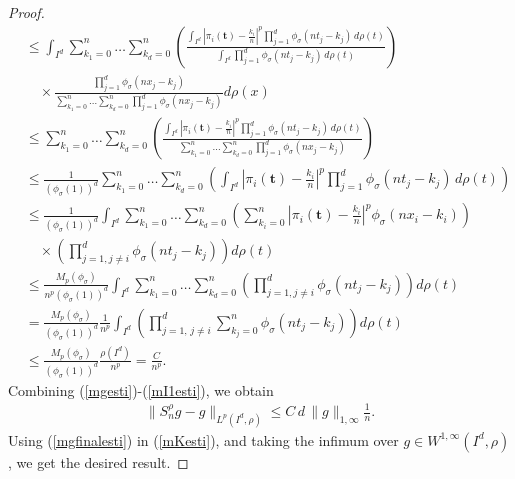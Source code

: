 \documentclass[12pt, reqno]{amsart}
\numberwithin{equation}{section}
\theoremstyle{definition}
\theoremstyle{remark}
\numberwithin{equation}{section}
\newcommand{\LP}{L^p(I^d, \rho)}
\begin{document}
\begin{proof}
\begin{align}
&\leq \int_{I^d}\sum_{k_1=0}^n \ldots \sum_{k_d=0}^n \left( \frac{\int_{I^d} \left|\pi_i(\mathbf{t}) - \frac{k_i}{n}\right|^p \prod_{j=1}^d \phi_\sigma(nt_j - k_j) \, d\rho(t)}{\int_{I^d} \prod_{j=1}^d \phi_\sigma(nt_j - k_j) \, d\rho(t)} \right) \nonumber \\
&\quad \times \frac{\prod_{j=1}^d \phi_\sigma(nx_j - k_j)}{\sum_{k_1=0}^n \ldots \sum_{k_d=0}^n \prod_{j=1}^d \phi_\sigma(nx_j - k_j)}   d\rho(x) \nonumber \\
&\leq \sum_{k_1=0}^n \ldots \sum_{k_d=0}^n  \left( \frac{\int_{I^d} \left|\pi_i(\mathbf{t}) - \frac{k_i}{n}\right|^p \prod_{j=1}^d \phi_\sigma(nt_j - k_j) \, d\rho(t)}{\sum_{k_1=0}^n \ldots \sum_{k_d=0}^n \prod_{j=1}^d \phi_\sigma(nx_j - k_j)} \right) \nonumber\\
&\leq \frac{1}{(\phi_\sigma(1))^d} \sum_{k_1=0}^n \ldots \sum_{k_d=0}^n  \left( \int_{I^d} \left|\pi_i(\mathbf{t}) - \frac{k_i}{n}\right|^p \prod_{j=1}^d \phi_\sigma(nt_j - k_j)\, d\rho(t)\right) \nonumber\\
&\leq \frac{1}{(\phi_\sigma(1))^d} \int_{I^d} \sum_{k_1=0}^n \ldots \sum_{k_d=0}^n  \left( \sum_{k_i=0}^n  \left|\pi_i(\mathbf{t}) - \frac{k_i}{n}\right|^p \phi_\sigma(nx_i-k_i)\right)\nonumber\\
&\quad \times \left( \prod_{j=1, j\neq i }^d \phi_\sigma(nt_j - k_j) \right) d\rho(t) \nonumber \\
&\leq \frac{M_p(\phi_\sigma)}{n^p (\phi_\sigma(1))^d} \int_{I^d} \sum_{k_1=0}^n \ldots \sum_{k_d=0}^n \left( \prod_{j=1, j\neq i }^d \phi_\sigma(nt_j - k_j) \right)d\rho(t) \nonumber \\
&=\frac{M_p(\phi_\sigma)}{(\phi_\sigma(1))^d} \frac{1}{n^p}\int_{I^d} \left( \prod_{j=1,\, j\neq i}^d \sum_{k_j=0}^n \phi_\sigma(nt_j-k_j)\right) d\rho(t) \nonumber \\
&\leq \frac{M_p(\phi_\sigma)}{(\phi_\sigma(1))^d} \frac{\rho(I^d)}{n^p} = \frac{C}{n^p}. \label{mI1esti}
\end{align}
Combining (\ref{mgesti})-(\ref{mI1esti}), we obtain \begin{align}
     \|S^{\rho}_ng-g\|_{\LP}  \leq C\,d\,\|g\|_{1,\infty} \frac{1}{n}. \label{mgfinalesti}
\end{align}
Using (\ref{mgfinalesti}) in (\ref{mKesti}), and taking the infimum over $g\in W^{1,\infty}(I^d,\rho)$, we get the desired result.
\end{proof}
\end{document}
